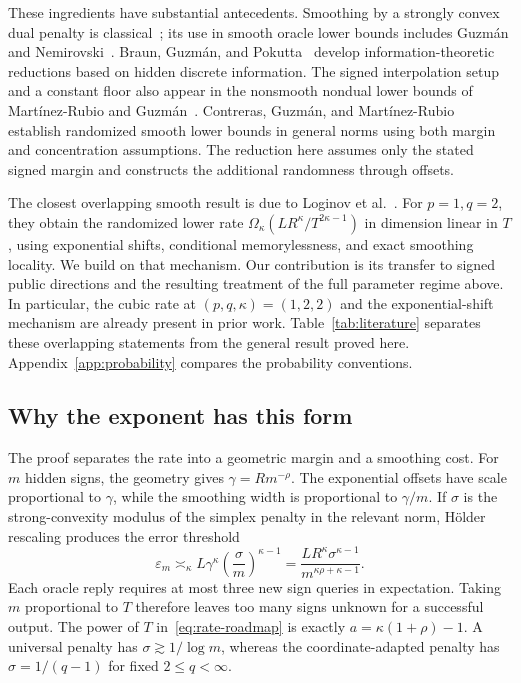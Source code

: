 \documentclass[11pt,a4paper]{article}
\theoremstyle{definition}
\theoremstyle{remark}
\newcommand{\eps}{\varepsilon}
\begin{document}
These ingredients have substantial antecedents. Smoothing by a strongly
convex dual penalty is classical~\cite{Nes05}; its use in smooth oracle lower
bounds includes Guzm\'an and Nemirovski~\cite{GN15}.
Braun, Guzm\'an, and Pokutta~\cite{BGP17} develop information-theoretic
reductions based on hidden discrete information. The signed interpolation
setup and a constant floor also appear in the nonsmooth nondual lower bounds
of Mart\'inez-Rubio and Guzm\'an~\cite[Appendix H]{MG26}.
Contreras, Guzm\'an, and Mart\'inez-Rubio~\cite[Theorem 26]{CGM25} establish
randomized smooth lower bounds in general norms using both margin and
concentration assumptions. The reduction here assumes only the stated signed
margin and constructs the additional randomness through offsets.

The closest overlapping smooth result is due to Loginov et
al.~\cite[Propositions D.7--D.8]{LG26}. For $p=1,q=2$, they obtain the
randomized lower rate $\Omega_\kappa(LR^\kappa/T^{2\kappa-1})$ in dimension
linear in $T$, using exponential shifts, conditional memorylessness, and exact
smoothing locality. We build on that mechanism. Our contribution is its
transfer to signed public directions and the resulting treatment of the full
parameter regime above. In particular, the cubic rate at
$(p,q,\kappa)=(1,2,2)$ and the exponential-shift mechanism are already present
in prior work. Table~\ref{tab:literature} separates these overlapping statements
from the general result proved here. Appendix~\ref{app:probability} compares
the probability conventions.

\subsection{Why the exponent has this form}\label{sec:roadmap}

The proof separates the rate into a geometric margin and a smoothing cost.
For $m$ hidden signs, the geometry gives
$\gamma=Rm^{-\rho}$. The exponential offsets have scale proportional to
$\gamma$, while the smoothing width is proportional to $\gamma/m$.
If $\sigma$ is the strong-convexity modulus of the simplex penalty in the
relevant norm, H\"older rescaling produces the error threshold
\begin{equation}\label{eq:rate-roadmap}
  \eps_m\asymp_\kappa
  L\gamma^\kappa\left(\frac{\sigma}{m}\right)^{\kappa-1}
  =\frac{LR^\kappa\sigma^{\kappa-1}}
         {m^{\kappa\rho+\kappa-1}}.
\end{equation}
Each oracle reply requires at most three new sign queries in expectation.
Taking $m$ proportional to $T$ therefore leaves too many signs unknown for a
successful output. The power of $T$ in~\eqref{eq:rate-roadmap} is exactly
$a=\kappa(1+\rho)-1$. A universal penalty has
$\sigma\gtrsim1/\log m$, whereas the coordinate-adapted penalty has
$\sigma=1/(q-1)$ for fixed $2\le q<\infty$.
\end{document}

